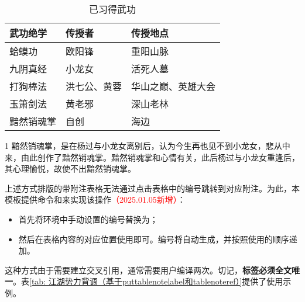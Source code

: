 \documentclass[doctor, vlined]{DissertUESTC}
\begin{document}
	\begin{table}[!ht]
		\caption{已习得武功} \label{tab: 已习得武功}
		\begin{threeparttable}
			\begin{tabular}{p{3cm} p{3cm} p{5cm}}
				\toprule
				\textbf{武功绝学} & \textbf{传授者} & \textbf{传授地点} \\
				\midrule
				蛤蟆功 & 欧阳锋 & 重阳山脉 \\
				九阴真经 & 小龙女 & 活死人墓 \\
				打狗棒法 & 洪七公、黄蓉 & 华山之巅、英雄大会 \\
				玉箫剑法 & 黄老邪 & 深山老林 \\
				黯然销魂掌\tnote{1} & 自创 & 海边 \\
				\bottomrule
			\end{tabular}
			\begin{tablenotes}[online]
				\item[1] 黯然销魂掌，是在杨过与小龙女离别后，认为今生再也见不到小龙女，悲从中来，由此创作了黯然销魂掌。黯然销魂掌和心情有关，此后杨过与小龙女重逢后，其心理愉悦，故使不出黯然销魂掌。
			\end{tablenotes}
		\end{threeparttable}
	\end{table}

	上述方式排版的带附注表格无法通过点击表格中的编号跳转到对应附注。为此，本模板提供命令和来实现该操作\textcolor{red}{（2025.01.05新增）}：

	\begin{itemize}
		\item 首先将环境中手动设置的编号替换为；
		\item 然后在表格内容的对应位置使用即可。编号将自动生成，并按照使用的顺序递加。
	\end{itemize}

	这种方式由于需要建立交叉引用，通常需要用户编译两次。切记，\textbf{标签必须全文唯一}。表\ref{tab: 江湖势力背调（基于puttablenotelabel和tablenoteref）}提供了使用示例。
\end{document}
